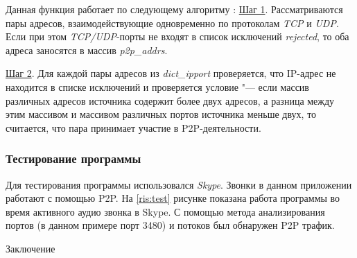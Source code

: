 \documentclass[bachelor, och, coursework]{SCWorks}
\begin{document}
Данная функция работает по следующему алгоритму \cite{algorithm}:
\underline{Шаг 1}. Рассматриваются пары адресов, взаимодействующие одновременно по протоколам \textit{TCP} и \textit{UDP}. 
Если при этом \textit{TCP/UDP}-порты не входят в список исключений \textit{rejected}, то оба адреса заносятся в массив \textit{p2p_addrs}.

\underline{Шаг 2}. Для каждой пары адресов из \textit{dict_ipport} проверяется, что IP-адрес не находится в списке исключений и проверяется
условие "--- если массив различных адресов источника содержит более двух адресов, а разница между этим массивом и массивом различных портов
источника меньше двух, то считается, что пара принимает участие в P2P-деятельности.

\subsubsection{Тестирование программы}
Для тестирования программы использовался \textit{Skype}. Звонки в данном приложении работают с помощью P2P. 
На \ref{ris:test} рисунке показана работа программы во время активного аудио звонка в Skype. С помощью метода анализирования 
портов (в данном примере порт 3480) и потоков был обнаружен P2P трафик.


\conclusion
Заключение



\end{document}
